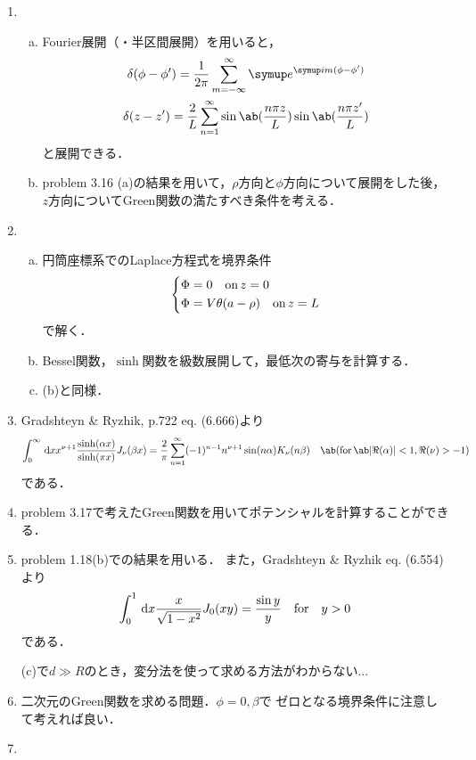 \begin{enumerate}[%
  label=%
  \fbox{%
   {\thesection.\arabic*}%
    },%
    ]
  \item %
    \begin{enumerate}[(a)]  
      \item Fourier展開（・半区間展開）を用いると，
        \begin{gather}
          \delta(\phi - \phi') = \frac{1}{2\pi} \sum_{m=-\infty}^{\infty} %
          \e^{\i m (\phi - \phi')}\\
          \delta(z- z') = \frac{2}{L} %
          \sum_{n=1}^\infty \sin\ab(\frac{n\pi z}{L}) \sin\ab(\frac{n \pi z'}{L})
        \end{gather}
        と展開できる．
      \item problem 3.16 (a)の結果を用いて，$\rho$方向と$\phi$方向について展開をした後，
        $z$方向についてGreen関数の満たすべき条件を考える．
    \end{enumerate}
  \item %
    \begin{enumerate}[(a)]  
      \item  円筒座標系でのLaplace方程式を境界条件
        \begin{gather}
          \begin{dcases}
            \Phi = 0 \hspace{1em} \text{on}\, z = 0\\
            \Phi = V\theta(a - \rho) \hspace{1em} \text{on} \, z = L
          \end{dcases}
        \end{gather}
        で解く．
      \item Bessel関数，$\sinh$関数を級数展開して，最低次の寄与を計算する．
      \item (b)と同様．
    \end{enumerate}
  \item %
    Gradshteyn \& Ryzhik, p.722 eq. (6.666)より
    \begin{gather}
      \int_0^\infty \dl{x} x^{\nu+1} %
      \frac{\sinh(\alpha x)}{\sinh(\pi x)} J_\nu(\beta x) %
      = \frac{2}{\pi}\sum_{n=1}^\infty (-1)^{n-1} n^{\nu+1} %
      \sin(n \alpha) K_\nu(n \beta)
      \qq\ab(\text{for}\,\ab|\Re(\alpha)| < 1, \Re(\nu) > -1)
    \end{gather}
    である．
  \item %
    problem 3.17で考えたGreen関数を用いてポテンシャルを計算することができる．
  \item %
    problem 1.18(b)での結果を用いる．
    また，Gradshteyn \& Ryzhik eq. (6.554)より
    \begin{gather}  
      \int_0^1 \dl{x} \frac{x}{\sqrt{1-x^2}}J_0(xy) = \frac{\sin y}{y} \qq\text{for}\qq y > 0
    \end{gather}
    である．

    (c)で$d \gg R$のとき，変分法を使って求める方法がわからない...
  \item %
    二次元のGreen関数を求める問題．$\phi = 0, \beta$で
    ゼロとなる境界条件に注意して考えれば良い．
  \item %

\end{enumerate} 



